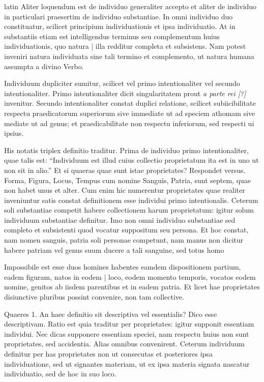 \begin{otherlanguage*}{latin}
\pstart
 Aliter loquendum est de individuo generaliter accepto et aliter de individuo in particulari praesertim de individuo substantiae. In omni individuo duo constituatur, scilicet principium individuationis et ipsa individuatio. At in substantiis etiam est intelligendus terminus seu complementum huius individuationis, quo natura \textnormal{|} illa redditur completa et subsistens. Nam potest inveniri natura individuata sine tali termino et complemento, ut natura humana assumpta a divino Verbo. 
\pend

\pstart
 Individuum dupliciter sumitur, scilicet vel primo intentionaliter vel secundo intentionaliter. Primo intentionaliter dicit singularitatem prout \emph{a parte rei [?]} invenitur. Secundo intentionaliter constat duplici relatione, scilicet subiicibilitate respectu praedicatorum superiorum sive immediate ut ad speciem athomam sive mediate ut ad genus; et praedicabilitate non respectu inferiorum, sed respecti ui ipsius. 
\pend

\pstart
 His notatis triplex definitio traditur. Prima de individuo primo intentionaliter, quae talis est: \enquote{Individuum est illud cuius collectio proprietatum ita est in uno ut non sit in alio.} Et si quaeras quae sunt istae proprietates? Respondet versus. Forma, Figura, Locus, Tempus cum nomine Sanguis, Patria, sunt septem, quae non habet unus et alter. Cum enim hic numerentur proprietates quae realiter inveniuntur satis constat definitionem esse individui primo intentionalis. Ceterum soli substantiae competit habere collectionem harum proprietatum: igitur solum individuum substantiae definitur. Imo non omni individuo substantiae sed completo et subsistenti quod vocatur suppositum seu persona. Et hoc constat, nam nomen sanguis, patria soli personae competunt, nam manus non dicitur habere patriam vel genus suum ducere a tali sanguine, sed totus homo 
\pend

\pstart
 Impossibile est esse duos homines habentes eamdem dispositionem partium, eadem figuram, natos in eodem \textnormal{|}   loco, eodem momento temporis, vocatos eodem nomine, genitos ab iisdem parentibus et in eadem patria. Et licet hae proprietates disiunctive pluribus possint convenire, non tam collective. 
\pend

\pstart
 Quaeres 1. An haec definitio sit descriptiva vel essentialis? Dico esse descriptivam. Ratio est quia traditur per proprietates: igitur supponit essentiam individui. Nec dicas supponere essentiam speciei, nam respectu huius non sunt proprietates, sed accidentia. Alias omnibus convenirent. Ceterum individuum definitur per has proprietates non ut consecutas et posteriores ipsa individuatione, sed ut signantes materiam, ut ex ipsa materia signata nascatur individuatio, sed de hoc in suo loco. 
\pend


\end{otherlanguage*}
